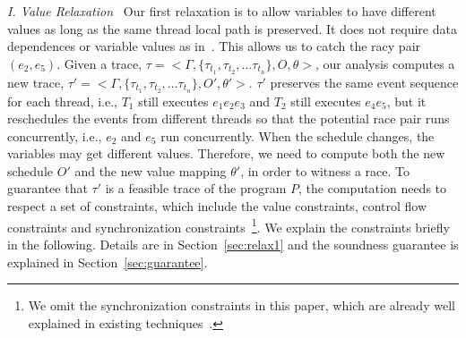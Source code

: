 \smallskip
\noindent
{\em I. Value Relaxation\ } Our first relaxation is to allow variables
to have different values as long as the same thread local path is preserved.
It does not require data dependences or variable values as in~\cite{...}.
This allows us to catch the racy pair $(e_2, e_5)$.
Given a trace, $\tau=<\Gamma , \{\tau_{t_1}, \tau_{t_2}, \dots \tau_{t_n} \},
 O, \theta>$, our analysis computes a new trace,  
$\tau'=<\Gamma , \{\tau_{t_1}, \tau_{t_2}, \dots \tau_{t_n} \}, O', \theta'>$.
 $\tau'$ preserves the same event sequence for each thread, i.e., $T_1$ still 
executes $e_1 e_2 e_3$ and $T_2$ still executes $e_4 e_5$, but it reschedules 
the events from different threads so that the potential race pair runs 
concurrently, i.e., $e_2$ and $e_5$ run concurrently. When the schedule 
changes, the variables may get different values. Therefore, we need to 
compute both the new schedule $O'$ and the new value mapping $\theta'$, in 
order to witness a race. To guarantee that $\tau'$ is a feasible trace of 
the program $P$, the computation needs to respect a set of constraints, 
which include the value constraints, control flow constraints and 
synchronization constraints~\footnote{We omit the synchronization constraints 
in this paper, which are already well explained in existing 
techniques~\cite{yannis, pecan}.}. We explain the constraints 
briefly in the following. Details are in Section~\ref{sec:relax1} 
and the soundness guarantee is explained in Section~\ref{sec:guarantee}.











